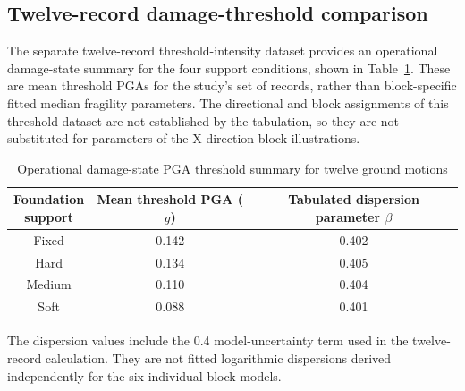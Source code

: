 \subsection*{Twelve-record damage-threshold comparison}
The separate twelve-record threshold-intensity dataset provides an operational damage-state summary for the four support conditions, shown in Table~\ref{tab:seq064_record_thresholds}. These are mean threshold PGAs for the study's set of records, rather than block-specific fitted median fragility parameters. The directional and block assignments of this threshold dataset are not established by the tabulation, so they are not substituted for parameters of the X-direction block illustrations.
\begin{table}[htbp]
\fontsize{11}{13}\selectfont\setlength{\tabcolsep}{4pt}
\centering
\caption{Operational damage-state PGA threshold summary for twelve ground motions}
\label{tab:seq064_record_thresholds}
\begin{tabular*}{\linewidth}{@{\extracolsep{\fill}}ccc@{}}
\toprule
\shortstack{Foundation\\support} & \shortstack{Mean threshold\\PGA ($g$)} & \shortstack{Tabulated dispersion\\parameter $\beta$} \\
\midrule
Fixed & 0.142 & 0.402 \\
Hard & 0.134 & 0.405 \\
Medium & 0.110 & 0.404 \\
Soft & 0.088 & 0.401 \\
\bottomrule
\end{tabular*}
\end{table}
The dispersion values include the 0.4 model-uncertainty term used in the twelve-record calculation. They are not fitted logarithmic dispersions derived independently for the six individual block models.

